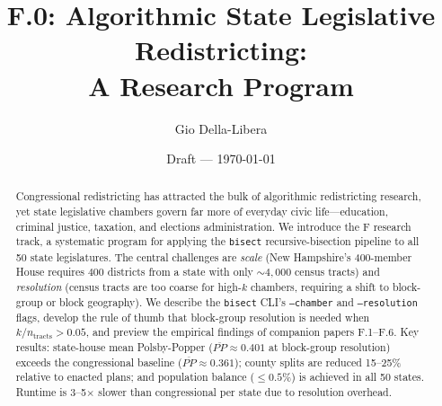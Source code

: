 \documentclass[12pt]{article}
\title{F.0: Algorithmic State Legislative Redistricting:\\
       A Research Program}
\author{Gio Della-Libera}
\date{Draft --- \today}
\begin{document}
\maketitle

\begin{abstract}
Congressional redistricting has attracted the bulk of algorithmic redistricting
research, yet state legislative chambers govern far more of everyday civic
life---education, criminal justice, taxation, and elections administration.
We introduce the F research track, a systematic program for applying the
\texttt{bisect} recursive-bisection pipeline to all 50 state legislatures.
The central challenges are \emph{scale} (New Hampshire's 400-member House
requires $400$ districts from a state with only $\sim\!4{,}000$ census tracts)
and \emph{resolution} (census tracts are too coarse for high-$k$ chambers,
requiring a shift to block-group or block geography).
We describe the \texttt{bisect} CLI's \texttt{--chamber} and \texttt{--resolution}
flags, develop the rule of thumb that block-group resolution is needed when
$k / n_{\mathrm{tracts}} > 0.05$, and preview the empirical findings of
companion papers F.1--F.6. Key results: state-house mean Polsby-Popper
($\overline{PP} \approx 0.401$ at block-group resolution) exceeds the
congressional baseline ($\overline{PP} \approx 0.361$); county splits are
reduced 15--25\% relative to enacted plans; and population balance
($\leq 0.5\%$) is achieved in all 50 states. Runtime is 3--5$\times$ slower
than congressional per state due to resolution overhead.
\end{abstract}











\end{document}
